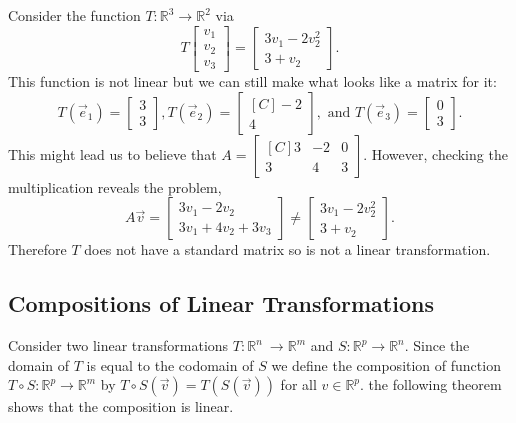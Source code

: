 \begin{example}
Consider the function $T:\mathbb{R}^3\to \mathbb{R}^2$ via
\[
T\begin{bmatrix}v_1 \\ v_2 \\ v_3 \end{bmatrix}
=\begin{bmatrix}3v_1-2v_2^2 \\ 3+v_2\end{bmatrix}.
\]
This function is not linear but we can still make what looks like a
matrix for it:
\[
T(\vec{e}_1)=\begin{bmatrix}3\\3\end{bmatrix},  
T(\vec{e}_2)=\begin{bmatrix*}[C]-2\\4\end{bmatrix*}, 
\text{ and }T(\vec{e}_3)=\begin{bmatrix}0\\3\end{bmatrix}.
\]
This might lead us to believe that $A=\begin{bmatrix*}[C] 3 & -2 & 
0 \\ 3 & 4 & 3 \end{bmatrix*}$. However, checking the multiplication reveals 
the problem,
\[A\vec{v}=\begin{bmatrix}3v_1-2v_2\\3v_1+4v_2+3v_3\end{bmatrix}
\neq \begin{bmatrix}3v_1-2v_2^2 \\ 3+v_2\end{bmatrix}.\]
Therefore $T$ does not have a standard matrix so is not a linear 
transformation.
\end{example}


\subsection{Compositions of Linear Transformations}
Consider two linear transformations 
$T:\mathbb{R}^n\ \to \mathbb{R}^m$ and $S:\mathbb{R}^p \to \mathbb{R}^n$. 
Since the domain of $T$ is equal to the codomain of $S$ we define the 
composition of function $T \circ S: \mathbb{R}^p \to \mathbb{R}^m$ by 
$T \circ S(\vec{v})=T(S(\vec{v}))$ for all $v \in \mathbb{R}^p$. 
the following theorem shows that the composition is linear.

